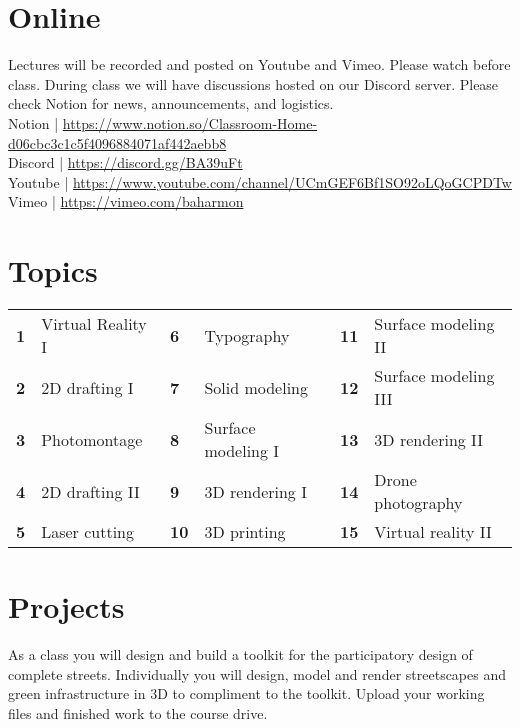 \documentclass[11pt,article,oneside]{memoir}
\begin{document}
\section{Online}

Lectures will be recorded and posted 
on Youtube and Vimeo. 
Please watch before class.
During class we will have discussions 
hosted on our Discord server. 
Please check Notion
for news, announcements, and logistics.\\

\noindent
Notion | \url{https://www.notion.so/Classroom-Home-d06cbc3c1c5f4096884071af442aebb8}\\
Discord | \url{https://discord.gg/BA39uFt}\\
Youtube | \url{https://www.youtube.com/channel/UCmGEF6Bf1SO92oLQoGCPDTw}\\
Vimeo | \url{https://vimeo.com/baharmon}\\

\section{Topics}

\begin{table}[H]
\begin{tabular}{l l @{\hskip 0.5cm} l l @{\hskip 0.5cm} l l}
\small
\textbf{1} & Virtual Reality I & \textbf{6} & Typography & \textbf{11} & Surface modeling II\\
\textbf{2} & 2D drafting I & \textbf{7} & Solid modeling & \textbf{12} & Surface modeling III\\
\textbf{3} & Photomontage & \textbf{8} & Surface modeling I & \textbf{13} & 3D rendering II\\
\textbf{4} & 2D drafting II & \textbf{9} & 3D rendering I & \textbf{14} & Drone photography\\
\textbf{5} & Laser cutting & \textbf{10} & 3D printing & \textbf{15} & Virtual reality II\\
\end{tabular}
\end{table}

\section{Projects}
As a class you will design and build a toolkit
for the participatory design of complete streets.
Individually you will design, model and render
streetscapes and green infrastructure in 3D
to compliment to the toolkit.
Upload your working files and finished work to the course drive.\\
\end{document}
